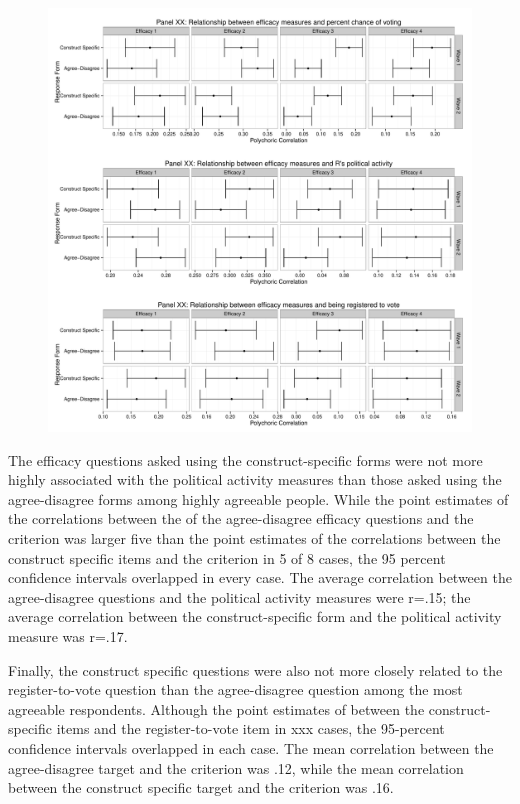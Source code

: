 \documentclass[man,apacite,floatsintext]{apa6}
\begin{document}
\begin{figure}
\includegraphics[width=\textwidth]{output/plot2validity.pdf}
\end{figure}

The efficacy questions asked using the construct-specific forms were not more highly associated with the political activity measures than those asked using the agree-disagree forms among highly agreeable people. While the point estimates of the correlations between the of the agree-disagree efficacy questions and the criterion was larger five than the point estimates of the correlations between the construct specific items and the criterion in 5 of 8 cases, the 95 percent confidence intervals overlapped in every case. The average correlation between the agree-disagree questions and the political activity measures were r=.15; the average correlation between the construct-specific form and the political activity measure was r=.17.

Finally, the construct specific questions were also not more closely related to the register-to-vote question than the agree-disagree question among the most agreeable respondents. Although the point estimates of between the construct-specific items and the register-to-vote item in xxx cases, the 95-percent confidence intervals overlapped in each case. The mean correlation between the agree-disagree target and the criterion was .12, while the mean correlation between the construct specific target and the criterion was .16. 
\end{document}
